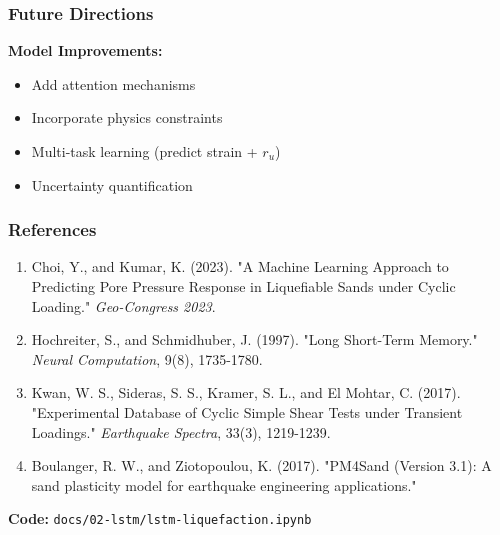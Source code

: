 \documentclass[notes]{beamer}
\begin{document}
\begin{frame}
\frametitle{Future Directions}

\textbf{Model Improvements:}
\begin{itemize}
\item Add attention mechanisms
\item Incorporate physics constraints
\item Multi-task learning (predict strain + $r_u$)
\item Uncertainty quantification
\end{itemize}

\vspace{0.5em}


\end{frame}

\begin{frame}
\frametitle{References}

\footnotesize
\begin{enumerate}
\item Choi, Y., and Kumar, K. (2023). "A Machine Learning Approach to Predicting Pore Pressure Response in Liquefiable Sands under Cyclic Loading." \textit{Geo-Congress 2023}.

\item Hochreiter, S., and Schmidhuber, J. (1997). "Long Short-Term Memory." \textit{Neural Computation}, 9(8), 1735-1780.

\item Kwan, W. S., Sideras, S. S., Kramer, S. L., and El Mohtar, C. (2017). "Experimental Database of Cyclic Simple Shear Tests under Transient Loadings." \textit{Earthquake Spectra}, 33(3), 1219-1239.

\item Boulanger, R. W., and Ziotopoulou, K. (2017). "PM4Sand (Version 3.1): A sand plasticity model for earthquake engineering applications."
\end{enumerate}

\vspace{1em}

\textbf{Code:} \texttt{docs/02-lstm/lstm-liquefaction.ipynb}

\end{frame}

\end{document}
